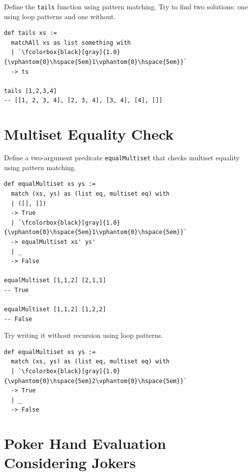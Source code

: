 Define the \lstinline{tails} function using pattern matching.
Try to find two solutions: one using loop patterns and one without.

\begin{lstlisting}[language=egison]
def tails xs :=
  matchAll xs as list something with
  | `\fcolorbox{black}[gray]{1.0}{\vphantom{0}\hspace{5em}1\vphantom{0}\hspace{5em}}`
  -> ts

tails [1,2,3,4]
-- [[1, 2, 3, 4], [2, 3, 4], [3, 4], [4], []]
\end{lstlisting}

\section*{Multiset Equality Check}

Define a two-argument predicate \lstinline{equalMultiset} that checks multiset equality using pattern matching.

\begin{lstlisting}[language=egison]
def equalMultiset xs ys :=
  match (xs, ys) as (list eq, multiset eq) with
  | ([], [])
  -> True
  | `\fcolorbox{black}[gray]{1.0}{\vphantom{0}\hspace{5em}1\vphantom{0}\hspace{5em}}`
  -> equalMultiset xs' ys'
  | _
  -> False

equalMultiset [1,1,2] [2,1,1]
-- True

equalMultiset [1,1,2] [1,2,2]
-- False
\end{lstlisting}

Try writing it without recursion using loop patterns.

\begin{lstlisting}[language=egison]
def equalMultiset xs ys :=
  match (xs, ys) as (list eq, multiset eq) with
  | `\fcolorbox{black}[gray]{1.0}{\vphantom{0}\hspace{5em}2\vphantom{0}\hspace{5em}}`
  -> True
  | _
  -> False
\end{lstlisting}

\section*{Poker Hand Evaluation Considering Jokers}


